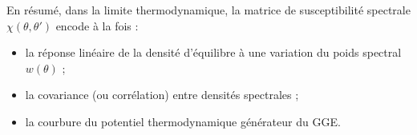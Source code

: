 \noindent
En résumé, dans la limite thermodynamique, la matrice de susceptibilité spectrale $\chi(\theta, \theta')$ encode à la fois :

\begin{itemize}[label = $\bullet$] 
  \item la réponse linéaire de la densité d'équilibre à une variation du poids spectral $w(\theta)$ ;
  \item la covariance (ou corrélation) entre densités spectrales ;
  \item la courbure du potentiel thermodynamique générateur du GGE.
\end{itemize}

%
%





